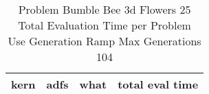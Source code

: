 \begin{table}[H]
\caption{Problem  Bumble Bee 3d  Flowers 25\\Total Evaluation Time per Problem \\ Use Generation Ramp  Max Generations 104\\}
\begin{center}
\scalebox{1.0} %
{
\begin{tabular}{lllr}
\hline
kern & adfs & what & total eval time \\
\hline


\end{tabular}
}
\end{center}
\end{table}

